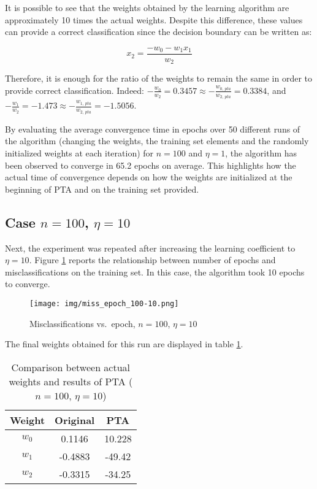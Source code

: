 \documentclass[12pt]{article}
\begin{document}
It is possible to see that the weights obtained by the learning algorithm are approximately 10 times the actual weights.
Despite this difference, these values can provide a correct classification since the decision boundary can be written as:

\begin{equation}
    x_2 = \frac{-w_0 - w_1 x_1}{w_2}
\end{equation}

Therefore, it is enough for the ratio of the weights to remain the same in order to provide correct classification.
Indeed: $-\frac{w_0}{w_2} = 0.3457 \approx -\frac{w_{0,\, pta}}{w_{2,\, pta}} = 0.3384$, and $-\frac{w_1}{w_2} = -1.473 \approx -\frac{w_{1,\, pta}}{w_{2,\, pta}} = -1.5056$.

By evaluating the average convergence time in epochs over 50 different runs of the algorithm (changing the weights, the training set elements and the randomly initialized weights at each iteration) for $n=100$ and $\eta=1$, the algorithm has been observed to converge in 65.2 epochs on average.
This highlights how the actual time of convergence depends on how the weights are initialized at the beginning of PTA and on the training set provided.

\subsection{Case $n=100$, $\eta=10$}
\label{sec:100-10}

Next, the experiment was repeated after increasing the learning coefficient to $\eta = 10$.
Figure \ref{fig:100-10-1} reports the relationship between number of epochs and misclassifications on the training set.
In this case, the algorithm took 10 epochs to converge.

\begin{figure}[h]
    \centering
    \texttt{[image: img/miss\_epoch\_100-10.png]}
    \caption{Misclassifications vs.\ epoch, $n=100$, $\eta=10$}
    \label{fig:100-10-1}
\end{figure}

The final weights obtained for this run are displayed in table \ref{tab:02}.

\begin{table}[h]
    \centering
    \begin{tabular}{|c|c|c|}
        \hline
        Weight & \textbf{Original} & \textbf{PTA} \\ 
        \hline
        \hline
        $w_0$ & 0.1146 & 10.228 \\
        \hline
        $w_1$ & -0.4883 & -49.42 \\
        \hline
        $w_2$ & -0.3315 & -34.25 \\
        \hline
    \end{tabular}
    \caption{Comparison between actual weights and results of PTA ($n=100$, $\eta=10$)}
    \label{tab:02}
\end{table}
\end{document}
